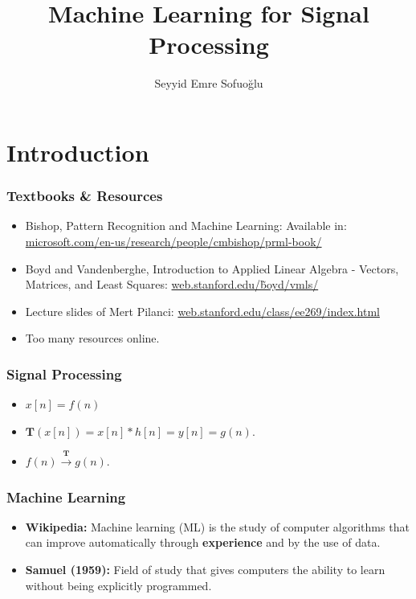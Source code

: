 \documentclass[a4,xcolor=dvipsnames]{beamer}
\title{Machine Learning for Signal Processing}
\author{Seyyid Emre Sofuo\u{g}lu}
\begin{document}
\setlength{\leftmargini}{0.2cm}

\begin{frame}
    \titlepage
\end{frame}

\section{Introduction}
\begin{frame}
    \frametitle{Textbooks \& Resources}
    \begin{itemize}
        \item Bishop, Pattern Recognition and Machine Learning: Available in: \scriptsize{\textcolor{blue}{\href{https://www.microsoft.com/en-us/research/people/cmbishop/prml-book/}{microsoft.com/en-us/research/people/cmbishop/prml-book/}}}
        \normalsize
        \item Boyd and Vandenberghe, Introduction to Applied Linear Algebra - Vectors, Matrices, and Least Squares: \textcolor{blue}{\href{https://web.stanford.edu/~boyd/vmls/}{web.stanford.edu/\~boyd/vmls/}}
        \item Lecture slides of Mert Pilanci: \textcolor{blue}{\href{http://web.stanford.edu/class/ee269/index.html}{web.stanford.edu/class/ee269/index.html}}
        \item Too many resources online.
    \end{itemize}
\end{frame}

\begin{frame}
    \frametitle{Signal Processing}

    \begin{itemize}
        \item $x[n] = f(n)$
        \item $\mathbf{T}\left(x[n]\right) = x[n]\ast h[n] = y[n] = g(n)$.
        \item $f(n) \xrightarrow{\mathbf{T}} g(n)$.
    \end{itemize}

\end{frame}

\begin{frame}
    \frametitle{Machine Learning}
    \begin{itemize}
        \item \textbf{Wikipedia:} Machine learning (ML) is the study of computer algorithms that can improve automatically through \textbf{experience} and by the use of data.
        \item \textbf{Samuel (1959):} Field of study that gives computers
        the ability to learn without being explicitly programmed.
    \end{itemize}   
\end{frame}
\end{document}
